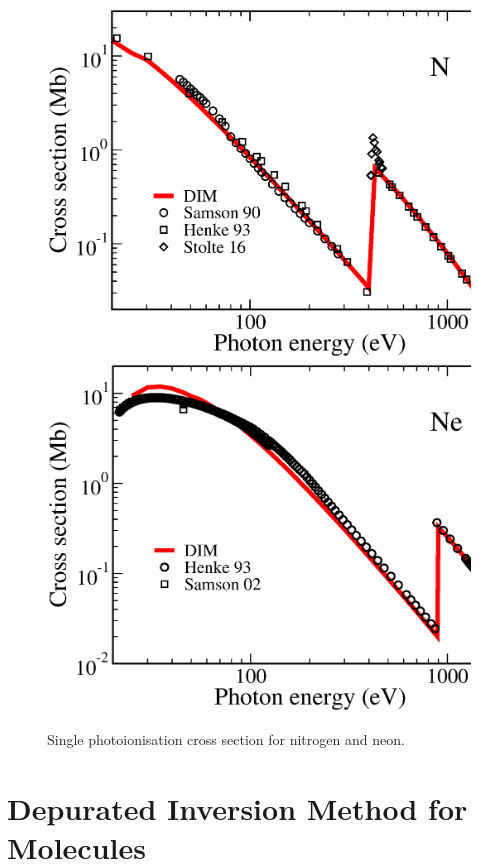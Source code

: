 \documentclass[10pt]{article}
\begin{document}
\begin{figure}[H]
\centering
 \includegraphics[height=0.23\textheight]{figures/dimpot/photoN.eps}
 \hspace{0.2cm}
 \includegraphics[height=0.23\textheight]{figures/dimpot/photoNe.eps}
\caption{Single photoionisation cross section for nitrogen and 
neon.}
\label{fig:photoDIM}
\end{figure}


\section{Depurated Inversion Method for Molecules}
\end{document}
